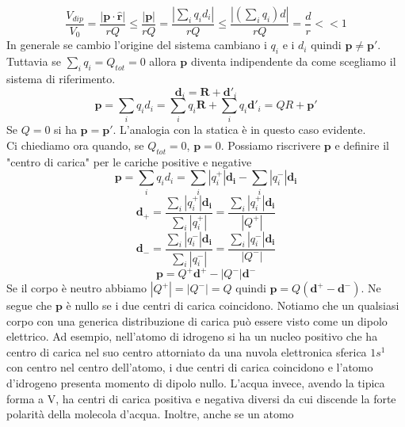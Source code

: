 \documentclass[
10pt, %
a4paper, %
oneside, %
headinclude,footinclude, %
BCOR5mm, %
]{scrartcl}
\begin{document}
 \[\frac{V_{dip}}{V_0} = \frac{|\mathbf{p}\cdot \hat{\mathbf{r}}|}{rQ}\leq\frac{|\mathbf{p}|}{rQ} = \frac{|\sum_i q_i d_i|}{rQ}\leq \frac{|(\sum_i q_i)d|}{rQ} = \frac{d}{r}<<1\]
 In generale se cambio l'origine del sistema cambiano i \(q_i\) e i \(d_i\) quindi \(\mathbf{p}\neq\mathbf{p}'\). Tuttavia se \(\sum_i q_i = Q_{tot} = 0\) allora $\mathbf{p}$ diventa indipendente da come scegliamo il sistema di riferimento. 
\[\mathbf{d}_i = \mathbf{R}+\mathbf{d}'_i\]
\[\mathbf{p} = \sum_iq_id_i = \sum_iq_i\mathbf{R}+\sum_iq_i\mathbf{d}'_i=QR+\mathbf{p}'\]
Se \(Q = 0\) si ha \(\mathbf{p} = \mathbf{p}'\). L'analogia con la statica è in questo caso evidente.\\
Ci chiediamo ora quando, se \(Q_{tot} = 0\), $\mathbf{p} = 0$. Possiamo riscrivere $\mathbf{p}$ e definire il "centro di carica" per le cariche positive e negative 
\[\mathbf{p} = \sum_iq_id_i = \sum_i|q_i^+|\mathbf{d_i}-\sum_i|q_i^-|\mathbf{d_i}\]
\[\mathbf{d}_+ = \frac{\sum_i|q_i^+|\mathbf{d_i}}{\sum_i|q_i^+|} = \frac{\sum_i|q_i^+|\mathbf{d_i}}{|Q^+|}\]
\[\mathbf{d}_- = \frac{\sum_i|q_i^-|\mathbf{d_i}}{\sum_i|q_i^-|} = \frac{\sum_i|q_i^-|\mathbf{d_i}}{|Q^-|}\]
\[\mathbf{p} = Q^+\mathbf{d}^+-|Q^-|\mathbf{d}^-\]
Se il corpo è neutro abbiamo \(|Q^+|=|Q^-|=Q\) quindi \(\mathbf{p} = Q(\mathbf{d}^+-\mathbf{d}^-)\). Ne segue che $\mathbf{p}$ è nullo se i due centri di carica coincidono. Notiamo che un qualsiasi corpo con una generica distribuzione di carica può essere visto come un dipolo elettrico. Ad esempio, nell'atomo di idrogeno si ha un nucleo positivo che ha centro di carica nel suo centro attorniato da una nuvola elettronica sferica \(1s^1\) con centro nel centro dell'atomo, i due centri di carica coincidono e l'atomo d'idrogeno presenta momento di dipolo nullo. L'acqua invece, avendo la tipica forma a V, ha centri di carica positiva e negativa diversi da cui discende la forte polarità della molecola d'acqua. Inoltre, anche se un atomo 
\end{document}

